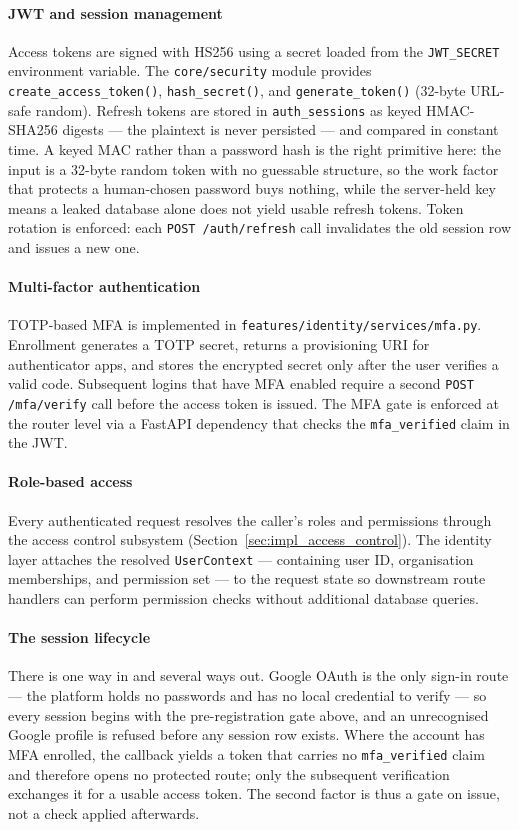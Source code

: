 \paragraph{JWT and session management}
Access tokens are signed with HS256 using a secret loaded from the \texttt{JWT\_SECRET} environment variable. The \texttt{core/security} module provides \texttt{create\_access\_token()}, \texttt{hash\_secret()}, and \texttt{generate\_token()} (32-byte URL-safe random). Refresh tokens are stored in \texttt{auth\_sessions} as keyed HMAC-SHA256 digests --- the plaintext is never persisted --- and compared in constant time. A keyed MAC rather than a password hash is the right primitive here: the input is a 32-byte random token with no guessable structure, so the work factor that protects a human-chosen password buys nothing, while the server-held key means a leaked database alone does not yield usable refresh tokens. Token rotation is enforced: each \texttt{POST /auth/refresh} call invalidates the old session row and issues a new one.

\paragraph{Multi-factor authentication}
TOTP-based MFA is implemented in \texttt{features/identity/services/mfa.py}. Enrollment generates a TOTP secret, returns a provisioning URI for authenticator apps, and stores the encrypted secret only after the user verifies a valid code. Subsequent logins that have MFA enabled require a second \texttt{POST /mfa/verify} call before the access token is issued. The MFA gate is enforced at the router level via a FastAPI dependency that checks the \texttt{mfa\_verified} claim in the JWT.

\paragraph{Role-based access}
Every authenticated request resolves the caller's roles and permissions through the access control subsystem (Section~\ref{sec:impl_access_control}). The identity layer attaches the resolved \texttt{UserContext} — containing user ID, organisation memberships, and permission set — to the request state so downstream route handlers can perform permission checks without additional database queries.

\paragraph{The session lifecycle}
There is one way in and several ways out. Google OAuth is the only sign-in route --- the platform holds no passwords and has no local credential to verify --- so every session begins with the pre-registration gate above, and an unrecognised Google profile is refused before any session row exists. Where the account has MFA enrolled, the callback yields a token that carries no \texttt{mfa\_verified} claim and therefore opens no protected route; only the subsequent verification exchanges it for a usable access token. The second factor is thus a gate on issue, not a check applied afterwards.

